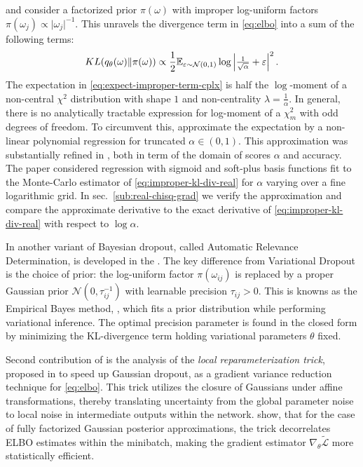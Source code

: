 \documentclass[a4paper,10pt]{article}
\begin{document}
\cite{kingma_variational_2015} and \cite{molchanov_variational_2017} consider a factorized
prior $\pi(\omega)$ with improper log-uniform factors $
  \pi(\omega_j) \propto \lvert \omega_j \rvert^{-1}
$. This unravels the divergence term in \eqref{eq:elbo} into a sum of the following terms:
\begin{equation} \label{eq:improper-kl-div-real}
  KL(q_\theta(\omega) \| \pi(\omega))
    \propto
      \frac12 \mathbb{E}_{\varepsilon \sim \mathcal{N}(0, 1)}
        \log{\Bigl\lvert \tfrac1{\sqrt{\alpha}} + \varepsilon \Bigr\rvert^2}
  \,.
\end{equation}
The expectation in \eqref{eq:expect-improper-term-cplx} is half the $\log$-moment of a non-central
$\chi^2$ distribution with shape $1$ and non-centrality $\lambda = \tfrac1{\alpha}$. In general,
there is no analytically tractable expression for log-moment of a $\chi^2_m$ with odd degrees
of freedom. To circumvent this, \cite{kingma_variational_2015} approximate the expectation by
a non-linear polynomial regression for truncated $\alpha \in (0, 1)$. This approximation was
substantially refined in \cite{molchanov_variational_2017}, both in term of the domain of scores
$\alpha$ and accuracy. The paper considered regression with sigmoid and soft-plus basis functions
fit to the Monte-Carlo estimator of \eqref{eq:improper-kl-div-real} for $\alpha$ varying over
a fine logarithmic grid. In sec.~\ref{sub:real-chisq-grad} we verify the approximation and
compare the approximate derivative to the exact derivative of \eqref{eq:improper-kl-div-real}
with respect to $\log \alpha$.

In another variant of Bayesian dropout, called Automatic Relevance Determination, is developed
in the \cite{kharitonov_variational_2018}. The key difference from Variational Dropout is the
choice of prior: the log-uniform factor $\pi(\omega_{ij})$ is replaced by a proper Gaussian
prior $\mathcal{N}(0, \tau^{-1}_{ij})$ with learnable precision $\tau_{ij} > 0$. This is knowns
as the Empirical Bayes method, \cite{citation_needed}, which fits a prior distribution while
performing variational inference. The optimal precision parameter is found in the closed form
by minimizing the KL-divergence term holding variational parameters $\theta$ fixed.

Second contribution of \cite{kingma_variational_2015} is the analysis of the \textit{local
reparameterization trick}, proposed in \cite{wang_fast_2013} to speed up Gaussian dropout,
as a gradient variance reduction technique for \eqref{eq:elbo}. This trick utilizes the
closure of Gaussians under affine transformations, thereby translating uncertainty from the
global parameter noise to local noise in intermediate outputs within the network.
%
\cite{kingma_variational_2015} show, that for the case of fully factorized Gaussian
posterior approximations, the trick decorrelates ELBO estimates within the minibatch,
making the gradient estimator $\nabla_\theta \tilde{\mathcal{L}}$ more statistically
efficient.
\end{document}
